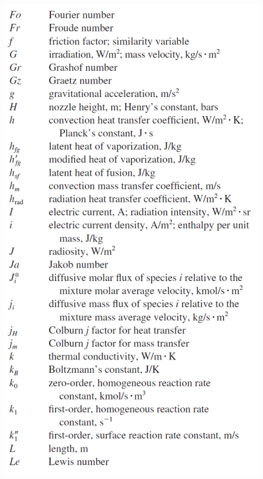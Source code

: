 \documentclass[10pt,landscape]{article}
\newenvironment{Figure}
     {\par\medskip\noindent\minipage{\linewidth}}
     {\endminipage\par\medskip}
\begin{document}
\begin{multicols}{3}
\begin{Figure}
\end{Figure}
\begin{Figure}
    \centering
    \includegraphics[width=\linewidth]{Symbols_2.png}
\end{Figure}
\begin{Figure}
    \centering

\end{Figure}
\end{multicols}
\end{document}
